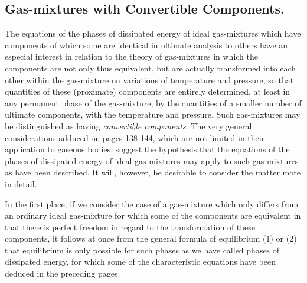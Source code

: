 \documentclass[12pt]{article}
\begin{document}

\subsection{Gas-mixtures with Convertible Components.}
The equations of the phases of dissipated energy of ideal gas-mixtures which have components of which some are identical in ultimate analysis to others have an especial interest in relation to the theory of gas-mixtures in which the components are not only thus equivalent, but are actually transformed into each other within the gas-mixture on variations of temperature and pressure, so that quantities of these (proximate) components are entirely determined, at least in any permanent phase of the gas-mixture, by the quantities of a smaller number of ultimate components, with the temperature and pressure. Such gas-mixtures may be distinguished as having \textit{convertible components}. The very general considerations adduced on pages 138-144, which are not limited in their application to gaseous bodies, suggest the hypothesis that the equations of the phases of dissipated energy of ideal gas-mixtures may apply to such gas-mixtures as have been described. It will, however, be desirable to consider the matter more in detail.


In the first place, if we consider the case of a gas-mixture which only differs from an ordinary ideal gas-mixture for which some of the components are equivalent in that there is perfect freedom in regard to the transformation of these components, it follows at once from the general formula of equilibrium (1) or (2) that equilibrium is only possible for such phases as we have called phases of dissipated energy, for which some of the characteristic equations have been deduced in the preceding pages.
\end{document}
